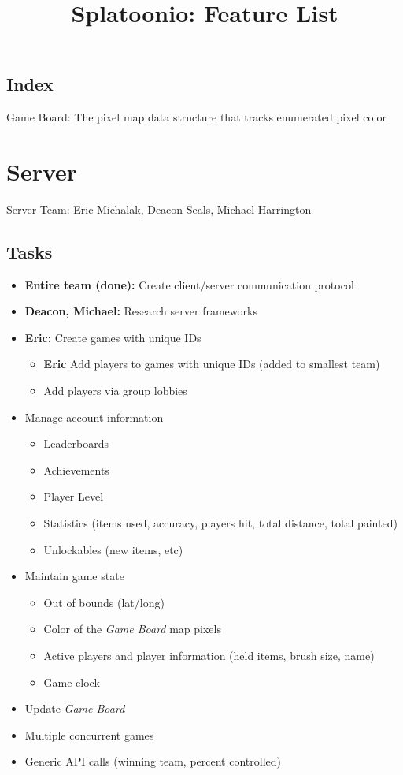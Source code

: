 \documentclass{article}
\title{Splatoonio: Feature List}
\author{}
\date{\vspace{-5ex}} %
\begin{document}
\maketitle
\tableofcontents

\subsection*{Index}
Game Board: The pixel map data structure that tracks enumerated pixel color

\newpage
\section{Server}
Server Team: Eric Michalak, Deacon Seals, Michael Harrington
\subsection{Tasks}
\begin{itemize}
\item \textbf{Entire team (done):} Create client/server communication protocol
\item \textbf{Deacon, Michael: } Research server frameworks
\item \textbf{Eric:} Create games with unique IDs
\begin{itemize}
	\item \textbf{Eric} Add players to games with unique IDs (added to smallest team)
	\item Add players via group lobbies
\end{itemize}
\item Manage account information
	\begin{itemize}
	\item Leaderboards
    \item Achievements
    \item Player Level
    \item Statistics (items used, accuracy, players hit, total distance, total painted)
    \item Unlockables (new items, etc)
	\end{itemize}
\item Maintain game state
	\begin{itemize}
	\item Out of bounds (lat/long)
    \item Color of the \emph{Game Board} map pixels
    \item Active players and player information (held items, brush size, name)
    \item Game clock
	\end{itemize}
\item Update \emph{Game Board}
\item Multiple concurrent games
\item Generic API calls (winning team, percent controlled)
\end{itemize}
\end{document}
